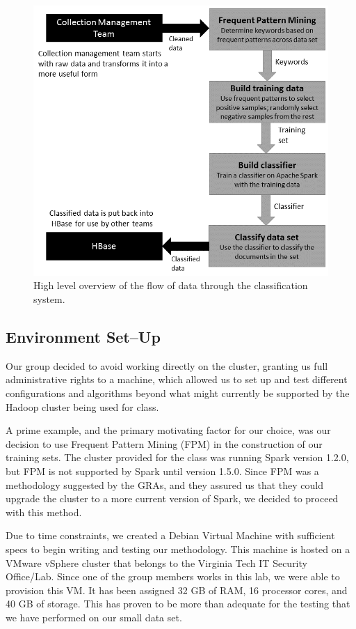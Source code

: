 \begin{figure}[ht]
	\centering
	\includegraphics[scale=.65]{figures/design_flow_chart.png}
    \caption{High level overview of the flow of data through the classification system.}
    \label{fig:overview}
\end{figure}

\subsection{Environment Set--Up}
Our group decided to avoid working directly on the cluster, granting us full administrative rights to a machine, which allowed us to set up and test different configurations and algorithms beyond what might currently be supported by the Hadoop cluster being used for class.

A prime example, and the primary motivating factor for our choice, was our decision to use Frequent Pattern Mining (FPM) in the construction of our training sets. The cluster provided for the class was running Spark version 1.2.0, but FPM is not supported by Spark until version 1.5.0. Since FPM was a methodology suggested by the GRAs, and they assured us that they could upgrade the cluster to a more current version of Spark, we decided to proceed with this method.

Due to time constraints, we created a Debian Virtual Machine with sufficient specs to begin writing and testing our methodology. This machine is hosted on a VMware vSphere cluster that belongs to the Virginia Tech IT Security Office/Lab. Since one of the group members works in this lab, we were able to provision this VM. It has been assigned 32 GB of RAM, 16 processor cores, and 40 GB of storage. This has proven to be more than adequate for the testing that we have performed on our small data set.


